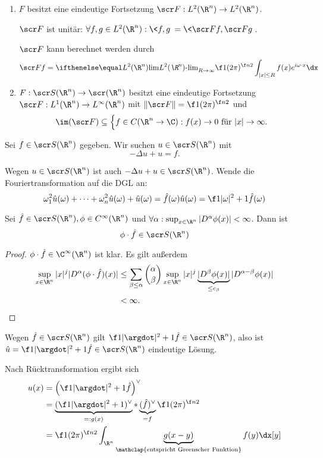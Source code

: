 \begin{nt}[Fortsetzungen] \label{4.31}
	\begin{enumerate}[1)]
		\item
			$F$ besitzt eine eindeutige Fortsetzung $\scr F: L^2(\R^n) \to L^2(\R^n)$.

			$\scr F$ ist unitär: $\forall f, g \in L^2(\R^n) : \<f,g\> = \<\scr F f, \scr F g\>$.

			$\scr F$ kann berechnet werden durch
			\[
				\scr F f = \lim[L^2(\R^n)]_{R\to \infty} \f 1{(2\pi)^{\f n2}} \int_{|x|\le R} f(x) e^{i \omega\cdot x} \dx
			\]
		\item
			$F : \scr S(\R^n) \to \scr(\R^n)$ besitzt eine eindeutige Fortsetzung $\scr F: L^1(\R^n) \to L^\infty(\R^n)$ mit $\| \scr F \| = \f 1{(2\pi)^{\f n2}}$ und
			\[
				\im (\scr F) \subset \Big\{ f \in C(\R^n \to \C) : f(x) \to 0 \text{ für $|x| \to \infty$}.
			\]
	\end{enumerate}
\end{nt}

\begin{ex} \label{4.30}
	Sei $f \in \scr S(\R^n)$ gegeben.
	Wir suchen $u \in \scr S(\R^n)$ mit
	\[
		- \Delta u + u = f.
	\]
	
	Wegen $u \in \scr S(\R^n)$ ist auch $-\Delta u + u \in \scr S(\R^n)$.
	Wende die Fouriertransformation auf die DGL an:
	\[
		\omega_1^2 \hat u(\omega) + \dotsb + \omega_n^2 \hat u(\omega) + \hat u(\omega) = \hat f(\omega)
		\hat u (\omega) = \f 1{|\omega|^2 + 1} \hat f(\omega)
	\]

	\begin{st*}
		Sei $\hat f \in \scr S(\R^n), \phi \in C^\infty(\R^n)$ und $\forall \alpha : \sup_{x\in \R^n} |D^\alpha \phi(x)| < \infty$.
		Dann ist
		\[
			\phi \cdot \hat f \in \scr S(\R^n)
		\]
		\begin{proof}
			$\phi \cdot \hat f \in \C^\infty(\R^n)$ ist klar.
			Es gilt außerdem
			\begin{align*}
				\sup_{x \in \R^n} |x|^j |D^\alpha (\phi \cdot \hat f)(x) |
				&\le \sum_{\beta \le \alpha} \binom{\alpha}{\beta} \sup_{x \in \R^n} |x|^j \underbrace{|D^\beta \phi(x)|}_{\le c_\beta} | D^{\alpha-\beta} \phi(x)| \\
				&< \infty.
			\end{align*}
		\end{proof}
	\end{st*}

	Wegen $\hat f \in \scr S(\R^n)$ gilt $\f 1{|\argdot|^2+1} \hat f \in \scr S(\R^n)$, also ist $\hat u = \f 1{|\argdot|^2+1} \hat f \in \scr S(\R^n)$ eindeutige Lösung.

	Nach Rücktransformation ergibt sich
	\begin{align*}
		u(x) 
		&= \Big( \f 1{|\argdot|^2+1} \hat f \Big)^\vee \\
		&= \underbrace{(\f 1{|\argdot|^2+1})^\vee}_{=:g(x)} \ast \underbrace{(\hat f)^\vee}_{=f} \f 1{(2\pi)^{\f n2}} \\
		&= \f 1{(2\pi)^{\f n2}} \int_{\R^n} \underbrace{g(x-y)}_{\mathclap{\text{entspricht Greenscher Funktion}}} f(y) \dx[y]
	\end{align*}
\end{ex}

